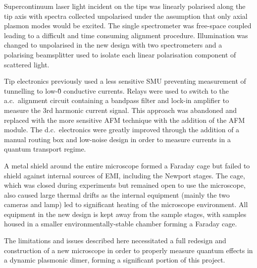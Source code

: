 \documentclass[12pt, a4paper, twoside]{book}
\begin{document}
Supercontinuum laser light incident on the tips was linearly polarised along the tip axis with spectra collected unpolarised under the assumption that only axial plasmon modes would be excited. The single spectrometer was free-space coupled leading to a difficult and time consuming alignment procedure. Illumination was changed to unpolarised in the new design with two spectrometers and a polarising beamsplitter used to isolate each linear polarisation component of scattered light.

Tip electronics previously used a less sensitive SMU preventing measurement of tunnelling to low-\G0 conductive currents. Relays were used to switch to the a.c.\ alignment circuit containing a bandpass filter and lock-in amplifier to measure the 3rd harmonic current signal. This approach was abandoned and replaced with the more sensitive AFM technique with the addition of the AFM module. The d.c.\ electronics were greatly improved through the addition of a manual routing box and low-noise design in order to measure currents in a quantum transport regime.

A metal shield around the entire microscope formed a Faraday cage but failed to shield against internal sources of EMI, including the Newport stages. The cage, which was closed during experiments but remained open to use the microscope, also caused large thermal drifts as the internal equipment (mainly the two cameras and lamp) led to significant heating of the microscope environment. All equipment in the new design is kept away from the sample stages, with samples housed in a smaller environmentally-stable chamber forming a Faraday cage.

The limitations and issues described here necessitated a full redesign and construction of a new microscope in order to properly measure quantum effects in a dynamic plasmonic dimer, forming a significant portion of this project.
\end{document}
